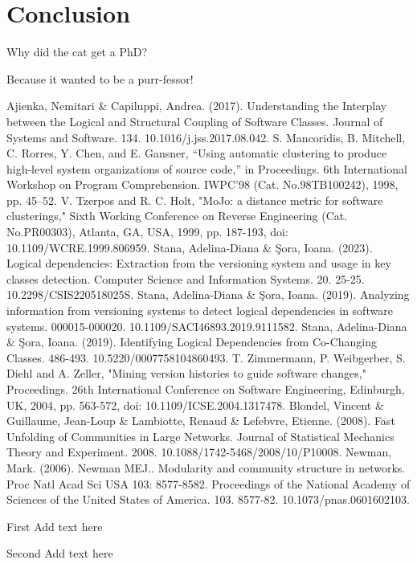 \documentclass{ieeeaccess}
\begin{document}
\section{Conclusion}
\label{sec:conclusion}
Why did the cat get a PhD?

Because it wanted to be a purr-fessor!

\begin{thebibliography}{00}

 Ajienka, Nemitari \& Capiluppi, Andrea. (2017). Understanding the Interplay between the Logical and Structural Coupling of Software Classes. Journal of Systems and Software. 134. 10.1016/j.jss.2017.08.042.
 S. Mancoridis, B. Mitchell, C. Rorres, Y. Chen, and E. Gansner, “Using automatic clustering to produce high-level system organizations of source code,” in Proceedings. 6th International Workshop on Program Comprehension. IWPC’98 (Cat. No.98TB100242), 1998, pp. 45–52.
 V. Tzerpos and R. C. Holt, "MoJo: a distance metric for software clusterings," Sixth Working Conference on Reverse Engineering (Cat. No.PR00303), Atlanta, GA, USA, 1999, pp. 187-193, doi: 10.1109/WCRE.1999.806959.
 Stana, Adelina-Diana \& Şora, Ioana. (2023). Logical dependencies: Extraction from the versioning system and usage in key classes detection. Computer Science and Information Systems. 20. 25-25. 10.2298/CSIS220518025S. 
 Stana, Adelina-Diana \& Şora, Ioana. (2019). Analyzing information from versioning systems to detect logical dependencies in software systems. 000015-000020. 10.1109/SACI46893.2019.9111582. 
 Stana, Adelina-Diana \& Şora, Ioana. (2019). Identifying Logical Dependencies from Co-Changing Classes. 486-493. 10.5220/0007758104860493. 
 T. Zimmermann, P. Weibgerber, S. Diehl and A. Zeller, "Mining version histories to guide software changes," Proceedings. 26th International Conference on Software Engineering, Edinburgh, UK, 2004, pp. 563-572, doi: 10.1109/ICSE.2004.1317478.
 Blondel, Vincent \& Guillaume, Jean-Loup \& Lambiotte, Renaud \& Lefebvre, Etienne. (2008). Fast Unfolding of Communities in Large Networks. Journal of Statistical Mechanics Theory and Experiment. 2008. 10.1088/1742-5468/2008/10/P10008. 
 Newman, Mark. (2006). Newman MEJ.. Modularity and community structure in networks. Proc Natl Acad Sci USA 103: 8577-8582. Proceedings of the National Academy of Sciences of the United States of America. 103. 8577-82. 10.1073/pnas.0601602103. 


\end{thebibliography}

\begin{IEEEbiographynophoto}{First} Add text here
\end{IEEEbiographynophoto}

\begin{IEEEbiographynophoto}{Second} Add text here
\end{IEEEbiographynophoto}

\EOD
\end{document}
